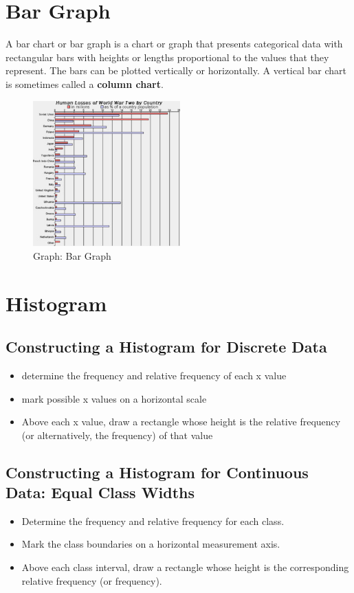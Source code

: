 \section{Bar Graph \cite{wiki-bar-chart}}\label{graph_bar}
A bar chart or bar graph is a chart or graph that presents categorical data with rectangular bars with heights or lengths proportional to the values that they represent. The bars can be plotted vertically or horizontally. A vertical bar chart is sometimes called a \textbf{column chart}.

\vspace{-1cm}

\begin{center}
    \begin{figure}
        \centering
        \includegraphics[height=5.6cm]{Pictures/data/data_graph_bar.jpg}
        \caption{Graph: Bar Graph}
    \end{figure}
\end{center}


\section{Histogram \cite{ism-2, wiki-histogram}}\label{histogram}
\subsection{Constructing a Histogram for Discrete Data}
\begin{itemize}
    \item determine the frequency and relative frequency of each x value
    \item mark possible x values on a horizontal scale
    \item Above each x value, draw a rectangle whose height is the relative frequency (or alternatively, the frequency) of that value
\end{itemize}

\subsection{Constructing a Histogram for Continuous Data: Equal Class Widths}
\begin{itemize}
    \item Determine the frequency and relative frequency for each class.
    \item Mark the class boundaries on a horizontal measurement axis.
    \item Above each class interval, draw a rectangle whose height is the corresponding relative frequency (or frequency).
\end{itemize}

